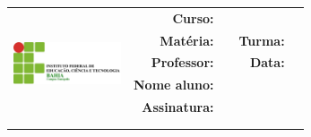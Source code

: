 \begin{tabularx}{\textwidth}{lrXrl}
	\multirow{6}{*}{\includegraphics[width=120px]{logo}} & \textbf{Curso:} & \multicolumn{3}{l}{ \curso } \\ 
	& \textbf{Matéria:} & \materia \space & \textbf{Turma:} & \turma \\ 
	& \textbf{Professor:} & \professor & \textbf{Data:}& \dataavaliacao\\ 
	& \textbf{Nome aluno:} & 
	\multicolumn{3}{l}{\name}   \\
	& \textbf{Assinatura:} & 
	\multicolumn{3}{l}{
	\namefield{
        \begin{minipage}{9.6cm}
          \vspace*{.8cm} \dotfill          
        \end{minipage}
 } }   \\
 \\
  
	\multicolumn{5}{c}{\textbf{\avaliacao}}  \\ \hline
\end{tabularx}	
